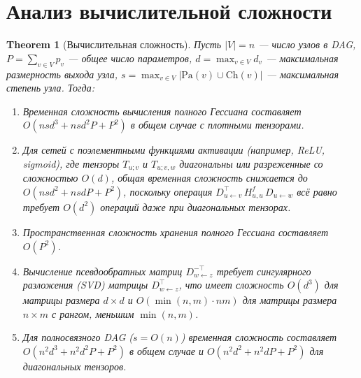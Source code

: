 \documentclass[11pt]{article}
\newtheorem{theorem}{Theorem}
\newcommand{\Pa}{\mathrm{Pa}} %
\newcommand{\Ch}{\mathrm{Ch}} %
\begin{document}
\section{Анализ вычислительной сложности}

\begin{theorem}[Вычислительная сложность]
  Пусть $|V|=n$ — число узлов в DAG, $P = \sum_{v \in V} p_v$ — общее число параметров, $d = \max_{v \in V}
  d_v$ — максимальная размерность выхода узла, $s = \max_{v \in V} |\Pa(v) \cup \Ch(v)|$ — максимальная
  степень узла. Тогда:

  \begin{enumerate}
    \item Временная сложность вычисления полного Гессиана составляет $O(n s d^3 + n s d^2 P + P^2)$ в общем
      случае с плотными тензорами.
    \item Для сетей с поэлементными функциями активации (например, ReLU, sigmoid), где тензоры $T_{u;v}$ и
      $T_{u;v,w}$ диагональны или разреженные со сложностью $O(d)$, общая временная сложность снижается до
      $O(n s d^2 + n s d P + P^2)$, поскольку операция $D_{u\gets v}^\top\,H^f_{u,u}\,D_{u\gets w}$ всё равно
      требует $O(d^2)$ операций даже при диагональных тензорах.
    \item Пространственная сложность хранения полного Гессиана составляет $O(P^2)$.
    \item Вычисление псевдообратных матриц $D_{w\gets z}^{-\top}$ требует сингулярного разложения (SVD)
      матрицы $D_{w\gets z}^{\top}$, что имеет сложность $O(d^3)$ для матрицы размера $d \times d$ и
      $O(\min(n,m) \cdot nm)$ для матрицы размера $n \times m$ с рангом, меньшим $\min(n,m)$.
    \item Для полносвязного DAG ($s = O(n)$) временная сложность составляет $O(n^2 d^3 + n^2 d^2 P + P^2)$ в
      общем случае и $O(n^2 d^2 + n^2 d P + P^2)$ для диагональных тензоров.
  \end{enumerate}
\end{theorem}
\end{document}
